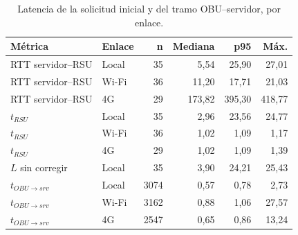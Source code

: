 \begin{table}[H]
\centering
\caption{Latencia de la solicitud inicial y del tramo OBU--servidor, por enlace.}
\label{tab:latencia_inicial}
\small
\begin{tabular}{llrrrr}
\toprule
\textbf{Métrica} & \textbf{Enlace} & \textbf{n} & \textbf{Mediana} & \textbf{p95} & \textbf{Máx.} \\
\midrule
RTT servidor--RSU & Local & 35 & 5,54 & 25,90 & 27,01 \\
RTT servidor--RSU & Wi-Fi & 36 & 11,20 & 17,71 & 21,03 \\
RTT servidor--RSU & 4G & 29 & 173,82 & 395,30 & 418,77 \\
$t_{RSU}$ & Local & 35 & 2,96 & 23,56 & 24,77 \\
$t_{RSU}$ & Wi-Fi & 36 & 1,02 & 1,09 & 1,17 \\
$t_{RSU}$ & 4G & 29 & 1,02 & 1,09 & 1,39 \\
$L$ sin corregir & Local & 35 & 3,90 & 24,21 & 25,43 \\
$t_{OBU\to srv}$ & Local & 3074 & 0,57 & 0,78 & 2,73 \\
$t_{OBU\to srv}$ & Wi-Fi & 3162 & 0,88 & 1,06 & 27,57 \\
$t_{OBU\to srv}$ & 4G & 2547 & 0,65 & 0,86 & 13,24 \\
\bottomrule
\end{tabular}
\par{}
\end{table}
